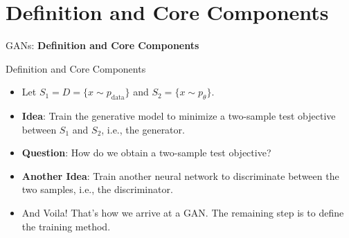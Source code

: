 \section{Definition and Core Components}
\begin{frame}{}
    \LARGE GANs: \textbf{Definition and Core Components}
\end{frame}

\begin{frame}{Definition and Core Components}
\begin{itemize}
    \item Let $S_1 = D = \{x \sim p_{\text{data}}\}$ and $S_2 = \{x \sim p_\theta\}$.
    \item \textbf{Idea}: Train the generative model to minimize a two-sample test objective between $S_1$ and $S_2$, i.e., the generator.
    \item<2-> \textbf{Question}: How do we obtain a two-sample test objective?
    \item<3-> \textbf{Another Idea}: Train another neural network to discriminate between the two samples, i.e., the discriminator.
    \item<4-> And Voila! That's how we arrive at a GAN. The remaining step is to define the training method.
\end{itemize}
\end{frame}

